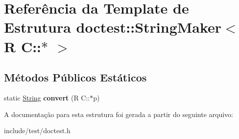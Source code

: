 \hypertarget{structdoctest_1_1StringMaker_3_01R_01C_1_1_5_01_4}{}\section{Referência da Template de Estrutura doctest\+:\+:String\+Maker$<$ R C\+:\+:$\ast$ $>$}
\label{structdoctest_1_1StringMaker_3_01R_01C_1_1_5_01_4}
\subsection*{Métodos Públicos Estáticos}
\begin{DoxyCompactItemize}
\item 
\mbox{\label{structdoctest_1_1StringMaker_3_01R_01C_1_1_5_01_4_a06144903aacd73ed31c2fb043be8abb0}} 
static \hyperlink{classdoctest_1_1String}{String} {\bfseries convert} (R C\+::$\ast$p)
\end{DoxyCompactItemize}


A documentação para esta estrutura foi gerada a partir do seguinte arquivo\+:\begin{DoxyCompactItemize}
\item 
include/test/doctest.\+h\end{DoxyCompactItemize}
